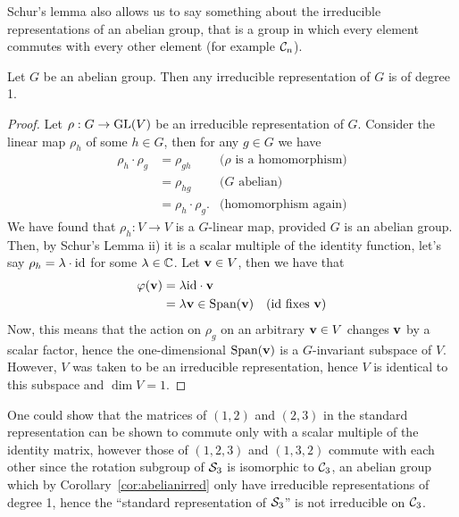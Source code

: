 Schur's lemma also allows us to say something about the irreducible representations of an abelian group, that is a group in which every element commutes with every other element (for example $\mathcal{C}_n$).

\begin{corollary}\label{cor:abelianirred}
	Let $G$ be an abelian group. Then any irreducible representation of $G$ is of degree 1.
\end{corollary}
\begin{proof}\cite[\textit{Mentioned in passing in} Sect.1.3.]{FultonHarris}
	Let $\rho: G \rightarrow \text{GL}(V)$ be an irreducible representation of $G$. Consider the linear map $\rho_h$ of some $h \in G$, then for any $g \in G$ we have
	\begin{align*}
		\rho_h \cdot \rho_g &= \rho_{gh} & \text{($\rho$ is a homomorphism)} \\
		&= \rho_{hg} & \text{($G$ abelian)} \\
		&= \rho_h \cdot \rho_g. & \text{(homomorphism again)}
	\end{align*}
	We have found that $\rho_h: V \rightarrow V$ is a $G$-linear map, provided $G$ is an abelian group. Then, by Schur's Lemma ii) it is a scalar multiple of the identity function, let's say $\rho_h = \lambda \cdot \text{id}$ for some $\lambda \in \mathbb{C}$. Let $\mathbf{v} \in V$, then we have that
	\begin{align*}
		\varphi(\mathbf{v}) &= \lambda \text{id} \cdot \mathbf{v} \\
		&= \lambda \mathbf{v} \in \text{Span}(\mathbf{v}) & \text{($\text{id}$ fixes $\mathbf{v}$)}
	\end{align*}
	Now, this means that the action on $\rho_g$ on an arbitrary $\mathbf{v} \in V$ changes $\mathbf{v}$ by a scalar factor, hence the one-dimensional $\text{Span}(\mathbf{v})$ is a $G$-invariant subspace of $V$. However, $V$ was taken to be an irreducible representation, hence $V$ is identical to this subspace and $\dim V = 1$.
\end{proof}

\begin{example}[$\Sym_3$]
	One could show that the matrices of $(1,2)$ and $(2,3)$ in the standard representation can be shown to commute only with a scalar multiple of the identity matrix, however those of $(1,2,3)$ and $(1,3,2)$ commute with each other since the rotation subgroup of $\Sym_3$ is isomorphic to $\mathcal{C}_3$, an abelian group which by Corollary~\ref{cor:abelianirred} only have irreducible representations of degree 1, hence the ``standard representation of $\Sym_3$'' is not irreducible on $\mathcal{C}_3$.
\end{example}

